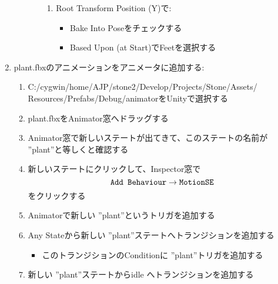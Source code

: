 \documentclass[a4paper]{report}
\newcommand{\fbxname}{{\ttfamily plant.fbx}}
\newcommand{\name}{ {\ttfamily ''plant''}}
\begin{document}
\begin{enumerate}
\begin{enumerate}
\begin{enumerate}
\begin{enumerate}
						\item Root Transform Position (Y)で:\begin{itemize}
								\item Bake Into Poseをチェックする
								\item Based Upon (at Start)でFeetを選択する
							\end{itemize}
					\end{enumerate}
			\end{enumerate}
	\end{enumerate}
\item \fbxname のアニメーションをアニメータに追加する:\begin{enumerate}
		\item {\ttfamily C:/cygwin/home/AJP/stone2/Develop/Projects/Stone/Assets/}\\{\ttfamily Resources/Prefabs/Debug/animator}をUnityで選択する
		\item \fbxname をAnimator窓へドラッグする
		\item Animator窓で新しいステートが出てきて、このステートの名前が\name と等しくと確認する
		\item 新しいステートにクリックして、Inspector窓で\begin{equation*}
				\mbox{\ttfamily Add Behaviour}\to\mbox{\ttfamily MotionSE}
			\end{equation*}
			をクリックする
		\item Animatorで新しい\name というトリガを追加する
		\item Any Stateから新しい \name ステートへトランジションを追加する
			\begin{itemize}
				\item このトランジションのConditionに\name トリガを追加する
			\end{itemize}
		\item 新しい \name ステートからidle へトランジションを追加する
	\end{enumerate}
\end{enumerate}
\end{document}
